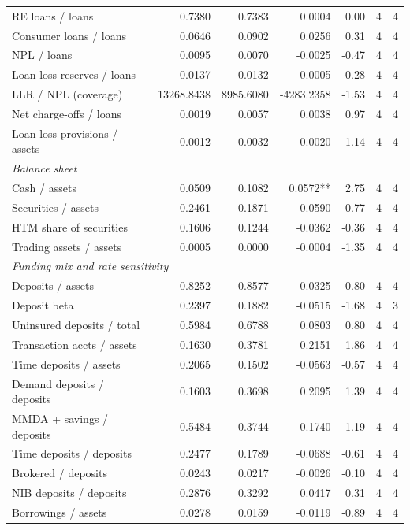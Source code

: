 \begin{tabular}{lrrrrrr}
RE loans / loans & 0.7380 & 0.7383 & 0.0004 & 0.00 & 4 & 4 \\
Consumer loans / loans & 0.0646 & 0.0902 & 0.0256 & 0.31 & 4 & 4 \\
NPL / loans & 0.0095 & 0.0070 & -0.0025 & -0.47 & 4 & 4 \\
Loan loss reserves / loans & 0.0137 & 0.0132 & -0.0005 & -0.28 & 4 & 4 \\
LLR / NPL (coverage) & 13268.8438 & 8985.6080 & -4283.2358 & -1.53 & 4 & 4 \\
Net charge-offs / loans & 0.0019 & 0.0057 & 0.0038 & 0.97 & 4 & 4 \\
Loan loss provisions / assets & 0.0012 & 0.0032 & 0.0020 & 1.14 & 4 & 4 \\
\midrule
\multicolumn{7}{l}{\emph{Balance sheet}} \\
\midrule
Cash / assets & 0.0509 & 0.1082 & 0.0572** & 2.75 & 4 & 4 \\
Securities / assets & 0.2461 & 0.1871 & -0.0590 & -0.77 & 4 & 4 \\
HTM share of securities & 0.1606 & 0.1244 & -0.0362 & -0.36 & 4 & 4 \\
Trading assets / assets & 0.0005 & 0.0000 & -0.0004 & -1.35 & 4 & 4 \\
\midrule
\multicolumn{7}{l}{\emph{Funding mix and rate sensitivity}} \\
\midrule
Deposits / assets & 0.8252 & 0.8577 & 0.0325 & 0.80 & 4 & 4 \\
Deposit beta & 0.2397 & 0.1882 & -0.0515 & -1.68 & 4 & 3 \\
Uninsured deposits / total & 0.5984 & 0.6788 & 0.0803 & 0.80 & 4 & 4 \\
Transaction accts / assets & 0.1630 & 0.3781 & 0.2151 & 1.86 & 4 & 4 \\
Time deposits / assets & 0.2065 & 0.1502 & -0.0563 & -0.57 & 4 & 4 \\
Demand deposits / deposits & 0.1603 & 0.3698 & 0.2095 & 1.39 & 4 & 4 \\
MMDA + savings / deposits & 0.5484 & 0.3744 & -0.1740 & -1.19 & 4 & 4 \\
Time deposits / deposits & 0.2477 & 0.1789 & -0.0688 & -0.61 & 4 & 4 \\
Brokered / deposits & 0.0243 & 0.0217 & -0.0026 & -0.10 & 4 & 4 \\
NIB deposits / deposits & 0.2876 & 0.3292 & 0.0417 & 0.31 & 4 & 4 \\
Borrowings / assets & 0.0278 & 0.0159 & -0.0119 & -0.89 & 4 & 4 \\

\end{tabular}
